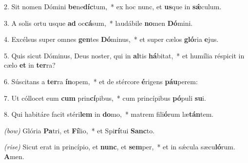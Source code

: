  2.  Sit nomen Dómini \textbf{be}ne\-\textbf{díc}tum,~*
	ex hoc nunc, et \textbf{us}que in \textbf{s\'{\ae}}culum.

 3. A solis ortu usque \textbf{ad} oc\textbf{cá}sum,~*
	laudábile \textbf{no}men \textbf{Dó}mini.

 4. Excélsus super omnes \textbf{gen}tes \textbf{Dó}\-minus,~*
	et super cælos \textbf{gló}ria \textbf{e}jus.

 5. Quis sicut Dóminus, Deus noster, qui in \textbf{al}tis \textbf{há}bitat,~*
	et humília réspicit in cælo \textbf{et} in \textbf{ter}ra?

 6. Súscitans a \textbf{ter}ra \textbf{ín}opem,~*
	et de stércore \textbf{é}rigens \textbf{páu}perem:

 7. Ut cóllocet eum \textbf{cum} prin\textbf{cí}pi\-bus,~*
	cum princípibus \textbf{pó}puli \textbf{su}i.

 8. Qui habitáre facit stéri\textbf{lem} in \textbf{do}\-mo,~*
	matrem fili\textbf{ó}rum læ\textbf{tán}tem.
	
{\color{red}\textit{(bow)}} Glória \textbf{Pa}tri, et \textbf{Fí}lio,~*
	et Spi\textbf{rí}tui \textbf{Sanc}to.

{\color{red}\textit{(rise)}} Sicut erat in princípio, et \textbf{nunc}, et \textbf{sem}per,~*
	et in s\'{\ae}cula sæcu\textbf{ló}rum. \textbf{A}men.
